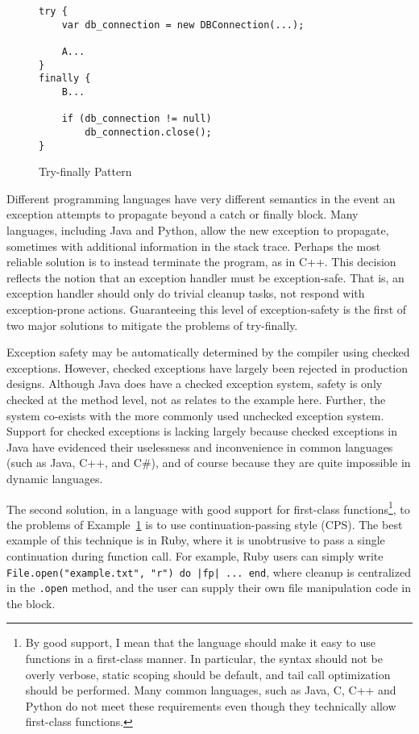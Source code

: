 \documentclass[11pt]{article}
\begin{document}
\begin{figure}[H]
\caption{Try-finally Pattern}
\label{tryPattern}
\begin{verbatim}
try {  
    var db_connection = new DBConnection(...);

    A...
}
finally {
    B...

    if (db_connection != null)
        db_connection.close();
}
\end{verbatim}
\end{figure}

Different programming languages have very different semantics in the event an exception attempts to propagate beyond a catch or finally block.
Many languages, including Java and Python, allow the new exception to propagate, sometimes with additional information in the stack trace.
Perhaps the most reliable solution is to instead terminate the program, as in C++.\cite{evolutionCplusplus}
This decision reflects the notion that an exception handler must be exception-safe.
That is, an exception handler should only do trivial cleanup tasks, not respond with exception-prone actions.
Guaranteeing this level of exception-safety is the first of two major solutions to mitigate the problems of try-finally.

Exception safety may be automatically determined by the compiler using checked exceptions.
However, checked exceptions have largely been rejected in production designs.
Although Java does have a checked exception system, safety is only checked at the method level, not as relates to the example here.
Further, the system co-exists with the more commonly used unchecked exception system.
Support for checked exceptions is lacking largely because checked exceptions in Java have evidenced their uselessness and inconvenience in common languages (such as Java, C++, and C\#), and of course because they are quite impossible in dynamic languages.

The second solution, in a language with good support for first-class functions\footnote{By good support, I mean that the language should make it easy to use functions in a first-class manner. In particular, the syntax should not be overly verbose, static scoping should be default, and tail call optimization should be performed. Many common languages, such as Java, C, C++ and Python do not meet these requirements even though they technically allow first-class functions.}, to the problems of Example~\ref{tryPattern} is to use continuation-passing style (CPS).
The best example of this technique is in Ruby, where it is unobtrusive to pass a single continuation during function call.
For example, Ruby users can simply write \texttt{File.open("example.txt", "r") do |fp| ... end}, where cleanup is centralized in the \texttt{.open} method, and the user can supply their own file manipulation code in the block.\cite{programmingRuby}
\end{document}
